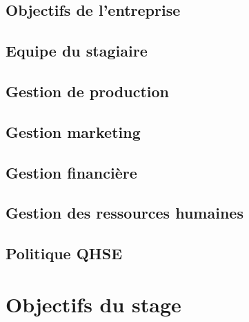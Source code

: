 \documentclass[10pt, oneside, a4paper]{article}
\begin{document}
\subsection{Objectifs de l'entreprise}


\subsection{Equipe du stagiaire}


\subsection{Gestion de production}


\subsection{Gestion marketing}


\subsection{Gestion financière}


\subsection{Gestion des ressources humaines}


\subsection{Politique QHSE}


\newpage
\section{Objectifs du stage}
\label{sec:objectifs}
\end{document}
